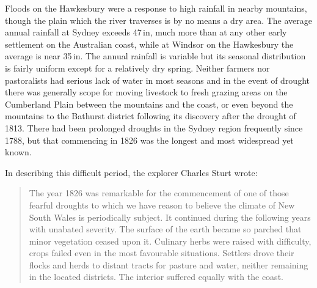 Floods on the Hawkesbury were a response to high rainfall in nearby
mountains, though the plain which the river traverses is by no means a
dry area.  The average annual rainfall at Sydney exceeds 47\,in, much
more than at any other early settlement on the Australian coast, while
at Windsor on the Hawkesbury the average is near
35\,in. The annual rainfall is variable but its seasonal distribution
is fairly uniform except for a relatively dry spring.  Neither farmers
nor pastoralists had serious lack of water in most seasons and in the
event of drought there was generally scope for moving livestock to
fresh grazing areas on the Cumberland Plain between the mountains and
the coast, or even beyond the mountains to the Bathurst district
following its discovery after the drought of 1813.  There had been
prolonged droughts in the Sydney region frequently since 1788, but
that commencing in 1826 was the longest and most widespread yet
known.

In describing this difficult period, the explorer Charles Sturt wrote:
\begin{quote}
	The year 1826 was remarkable for the commencement of one of
	those fearful droughts to which we have reason to believe the
	climate of New South Wales is periodically subject.  It
	continued during the following years with unabated severity.
	The surface of the earth became so parched that minor
	vegetation ceased upon it.  Culinary herbs were raised with
	difficulty, crops failed even in the most favourable
	situations.  Settlers drove their flocks and herds to distant
	tracts for pasture and water, neither remaining in the located
	districts.  The interior suffered equally with the
	coast.
\end{quote}

